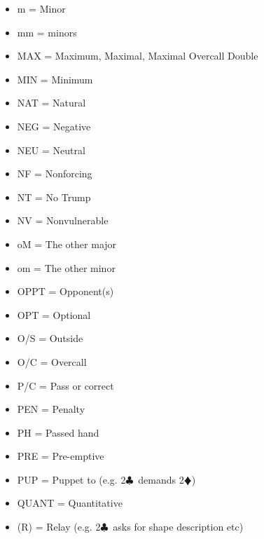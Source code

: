 \documentclass[a4paper]{article}
\newcommand{\BC}{\textcolor{OliveGreen}{$\clubsuit$}}
\newcommand{\BD}{\textcolor{RedOrange}{$\vardiamondsuit$}}
\begin{document}
\begin{itemize}
\item m            = Minor

\item mm           = minors

\item MAX          = Maximum, Maximal, Maximal Overcall Double

\item MIN          = Minimum

\item NAT          = Natural

\item NEG          = Negative

\item NEU          = Neutral

\item NF           = Nonforcing

\item NT           = No Trump

\item NV           = Nonvulnerable

\item oM           = The other major

\item om           = The other minor

\item OPPT         = Opponent(s)

\item OPT          = Optional

\item O/S          = Outside

\item O/C          = Overcall

\item P/C          = Pass or correct

\item PEN          = Penalty

\item PH           = Passed hand

\item PRE          = Pre-emptive

\item PUP          = Puppet to (e.g. 2\BC\ demands 2\BD )

\item QUANT        = Quantitative

\item (R)          = Relay (e.g. 2\BC\ asks for shape description etc)


\end{itemize}
\end{document}
